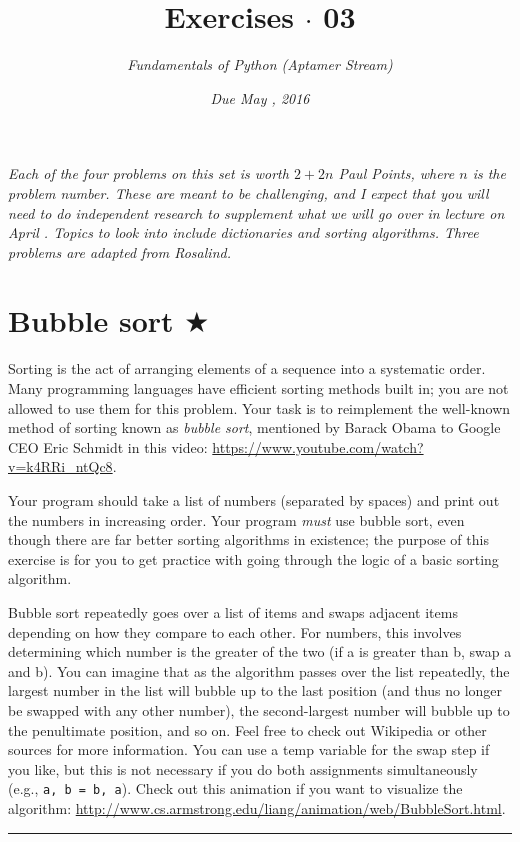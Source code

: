 \documentclass[12pt, letterpaper]{article}
\title{Exercises $\cdot$ 03}
\author{\textit{Fundamentals of Python (Aptamer Stream)}}
\date{\textit{Due May \nth{6}, 2016}}
\begin{document}
\maketitle
\textit{Each of the four problems on this set is worth $2 + 2n$ Paul Points, where $n$ is the problem number. These are meant to be challenging, and I expect that you will need to do independent research to supplement what we will go over in lecture on April . Topics to look into include dictionaries and sorting algorithms. Three problems are adapted from Rosalind.}

\section{\upshape Bubble sort $\bigstar$}
Sorting is the act of arranging elements of a sequence into a systematic order. Many programming languages have efficient sorting methods built in; you are not allowed to use them for this problem. Your task is to reimplement the well-known method of sorting known as \emph{bubble sort}, mentioned by Barack Obama to Google CEO Eric Schmidt in this video: \url{https://www.youtube.com/watch?v=k4RRi_ntQc8}.

Your program should take a list of numbers (separated by spaces) and print out the numbers in increasing order. Your program \emph{must} use bubble sort, even though there are far better sorting algorithms in existence; the purpose of this exercise is for you to get practice with going through the logic of a basic sorting algorithm.

Bubble sort repeatedly goes over a list of items and swaps adjacent items depending on how they compare to each other. For numbers, this involves determining which number is the greater of the two (if a is greater than b, swap a and b). You can imagine that as the algorithm passes over the list repeatedly, the largest number in the list will bubble up to the last position (and thus no longer be swapped with any other number), the second-largest number will bubble up to the penultimate position, and so on. Feel free to check out Wikipedia or other sources for more information. You can use a temp variable for the swap step if you like, but this is not necessary if you do both assignments simultaneously (e.g., \texttt{a, b = b, a}). Check out this animation if you want to visualize the algorithm: \url{http://www.cs.armstrong.edu/liang/animation/web/BubbleSort.html}.

\vspace{2mm}\hrule\vspace{2mm}
\end{document}
